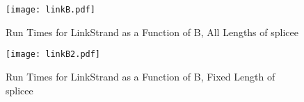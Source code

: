 \documentclass[12pt]{article}
\begin{document}
\begin{center}
\begin{figure}[h!]
\centering
\texttt{[image: linkB.pdf]}
\caption{Run Times for LinkStrand as a Function of B, All Lengths of splicee}
\label{linkB}
\end{figure}
\end{center}

\begin{center}
\begin{figure}[h!]
\centering
\texttt{[image: linkB2.pdf]}
\caption{Run Times for LinkStrand as a Function of B, Fixed Length of splicee}
\label{linkB2}
\end{figure}
\end{center}
\end{document}
